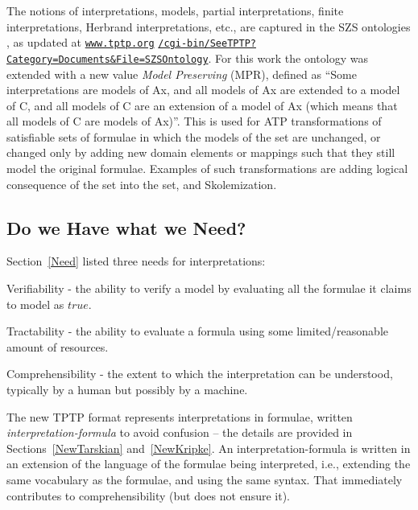 \documentclass{easychair}
\newenvironment{packed_itemize}{
\vspace*{-0.2em}
\begin{itemize}
\setlength{\partopsep}{0pt}
\setlength{\itemsep}{1pt}
\setlength{\parskip}{0pt}
\setlength{\parsep}{0pt}
}{\end{itemize}}
\begin{document}
The notions of interpretations, models, partial interpretations, finite interpretations,
Herbrand interpretations, etc., are captured in the SZS ontologies \cite{Sut08-KEAPPA}, as
updated at 
\href{https://www.tptp.org/cgi-bin/SeeTPTP?Category=Documents\&File=SZSOntology}{\tt www.tptp.org}
\href{https://www.tptp.org/cgi-bin/SeeTPTP?Category=Documents\&File=SZSOntology}{\tt /cgi-bin/SeeTPTP?Category=Documents\&File=SZSOntology}.
For this work the ontology was extended with a new value {\em Model Preserving} (MPR), defined
as ``Some interpretations are models of Ax, and
  all models of Ax are extended to a model of C, and
  all models of C are an extension of a model of Ax
  (which means that all models of C are models of Ax)''.
This is used for ATP transformations of satisfiable sets of formulae in which the models
of the set are unchanged, or changed only by adding new domain elements or mappings such
that they still model the original formulae.
Examples of such transformations are adding logical consequence of the set into the set, and
Skolemization.

\subsection{Do we Have what we Need?}
\label{HaveNeed}

Section~\ref{Need} listed three needs for interpretations: 
\begin{packed_itemize}
\item Verifiability - the ability to verify a model by evaluating all the formulae it claims
      to model as $true$.
\item Tractability - the ability to evaluate a formula using some limited/reasonable amount of
      resources.
\item Comprehensibility - the extent to which the interpretation can be understood, typically
      by a human but possibly by a machine.
\end{packed_itemize}

The new TPTP format represents interpretations in formulae, written {\em interpretation-formula}
to avoid confusion -- the details are provided in Sections~\ref{NewTarskian} and~\ref{NewKripke}.
An interpretation-formula is written in an extension of the language of the formulae being 
interpreted, i.e., extending the same vocabulary as the formulae, and using the same syntax.
That immediately contributes to comprehensibility (but does not ensure it).
\end{document}
